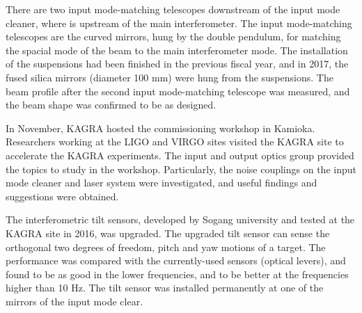 There are two input mode-matching telescopes downstream of the input mode cleaner, where is upstream of the main interferometer. The input mode-matching telescopes are the curved mirrors, hung by the double pendulum, for matching the spacial mode of the beam to the main interferometer mode. The installation of the suspensions had been finished in the previous fiscal year, and in 2017, the fused silica mirrors (diameter 100 mm) were hung from the suspensions. The beam profile after the second input mode-matching telescope was measured, and the beam shape was confirmed to be as designed.

In November, KAGRA hosted the commissioning workshop in Kamioka. Researchers working at the LIGO and VIRGO sites visited the KAGRA site to accelerate the KAGRA experiments. The input and output optics group provided the topics to study in the workshop. Particularly, the noise couplings on the input mode cleaner and laser system were investigated, and useful findings and suggestions were obtained.

The interferometric tilt sensors, developed by Sogang university and tested at the KAGRA site in 2016, was upgraded. The upgraded tilt sensor can sense the orthogonal two degrees of freedom, pitch and yaw motions of a target. The performance was compared with the currently-used sensors (optical levers), and found to be as good in the lower frequencies, and to be better at the frequencies higher than 10 Hz. The tilt sensor was installed permanently at one of the mirrors of the input mode clear.

